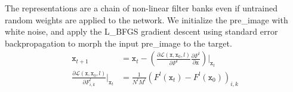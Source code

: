 \documentclass{article}
\begin{document}
The representations are a chain of non-linear filter banks even if untrained random weights are applied to the network.
We initialize the pre\_image with white noise,
and apply the L\_BFGS gradient descent using standard error backpropagation to morph the input pre\_image to the target.
\setlength{\belowdisplayskip}{2pt}
\setlength{\abovedisplayskip}{2pt}
\begin{align}
 \texttt{x}_{t+1}  &= \texttt{x}_t - \left(\frac{ \partial  \mathcal{L}(\texttt{x},\texttt{x}_0,l) }{ \partial F^l}  \frac{\partial F^l}{\partial \texttt{x}}\right) \bigg|_{\texttt{x}_t}  \\
  \frac{\partial \mathcal{L}(\texttt{x},\texttt{x}_0,l)}{\partial{F^l_{i,k}}}\bigg|_{\texttt{x}_t}  &= \frac{1}{N^l M^l}(F^l(\texttt{x}_t)-F^l(\texttt{x}_0))_{i,k}  %
\end{align}
\end{document}
